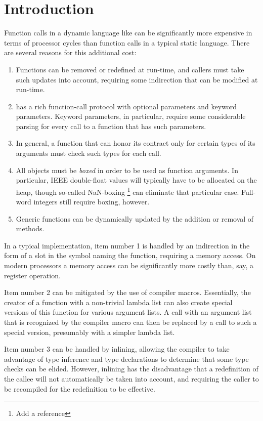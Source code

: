 \section{Introduction}
\label{sec-introduction}

Function calls in a dynamic language like \commonlisp{} can be
significantly more expensive in terms of processor cycles than
function calls in a typical static language.  There are several
reasons for this additional cost:

\begin{enumerate}
\item Functions can be removed or redefined at run-time, and callers
  must take such updates into account, requiring some indirection that
  can be modified at run-time.
\item \commonlisp{} has a rich function-call protocol with optional
  parameters and keyword parameters.  Keyword parameters, in
  particular, require some considerable parsing for every
  call to a function that has such parameters.
\item In general, a function that can honor its contract only for
  certain types of its arguments must check such types for each call.
\item All objects must be \emph{boxed} in order to be used as function
  arguments.  In particular, IEEE double-float values will typically
  have to be allocated on the heap, though so-called NaN-boxing%
  \footnote{Add a reference} can
  eliminate that particular case.  Full-word integers still require
  boxing, however.
\item Generic functions can be dynamically updated by the addition or
  removal of methods.
\end{enumerate}

In a typical \commonlisp{} implementation, item number 1 is handled by
an indirection in the form of a slot in the symbol naming the
function, requiring a memory access.  On modern processors a memory
access can be significantly more costly than, say, a register
operation.

Item number 2 can be mitigated by the use of compiler macros.
Essentially, the creator of a function with a non-trivial lambda list
can also create special versions of this function for various argument
lists.  A call with an argument list that is recognized by the
compiler macro can then be replaced by a call to such a special
version, presumably with a simpler lambda list.

Item number 3 can be handled by inlining, allowing the compiler to
take advantage of type inference and type declarations to determine
that some type checks can be elided.  However, inlining has the
disadvantage that a redefinition of the callee will not automatically
be taken into account, and requiring the caller to be recompiled for
the redefinition to be effective.


